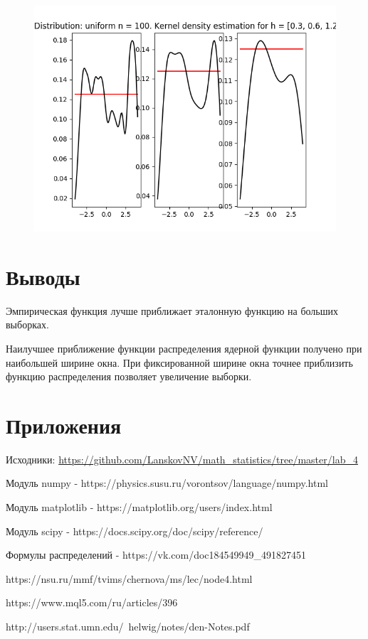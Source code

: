 \documentclass[12pt]{article}
\begin{document}
\begin{center}
\begin{figure}[H]
\includegraphics[width=\textwidth]{kernel/d_uniform100.png}
\end{figure}
\end{center}


\section{Выводы}
Эмпирическая функция лучше приближает эталонную функцию на больших выборках.

Наилучшее приближение функции распределения ядерной функции получено при наибольшей ширине окна. При фиксированной ширине окна точнее приблизить функцию распределения позволяет увеличение выборки.

\section{Приложения}

Исходники: \url{https://github.com/LanskovNV/math_statistics/tree/master/lab_4}

\newpage

\begin{thebibliography}{}
      Модуль numpy  -  https://physics.susu.ru/vorontsov/language/numpy.html
    
    Модуль matplotlib - https://matplotlib.org/users/index.html
    
    Модуль scipy - https://docs.scipy.org/doc/scipy/reference/
    
    Формулы распределений  -  https://vk.com/doc184549949\_491827451
    
    https://nsu.ru/mmf/tvims/chernova/ms/lec/node4.html
    
    https://www.mql5.com/ru/articles/396
    
    http://users.stat.umn.edu/~helwig/notes/den-Notes.pdf
\end{thebibliography}
\end{document}
